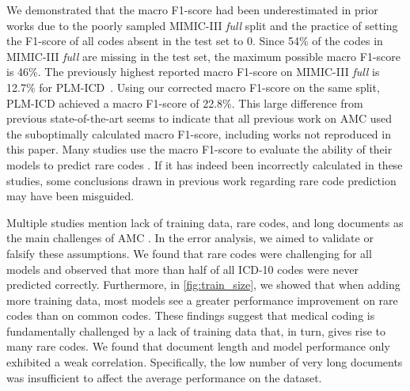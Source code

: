 {We demonstrated that the macro F1-score had been underestimated in prior works due to the poorly sampled MIMIC-III \textit{full} split and the practice of setting the F1-score of all codes absent in the test set to 0. Since 54\% of the codes in MIMIC-III \textit{full} are missing in the test set, the maximum possible macro F1-score is 46\%. The previously highest reported macro F1-score on MIMIC-III \textit{full} is 12.7\% for PLM-ICD~\parencite{kimReadAttendCode2021}. Using our corrected macro F1-score on the same split, PLM-ICD achieved a macro F1-score of 22.8\%. This large difference from previous state-of-the-art seems to indicate that all previous work on AMC used the suboptimally calculated macro F1-score, including works not reproduced in this paper. Many studies use the macro F1-score to evaluate the ability of their models to predict rare codes \parencite{kimReadAttendCode2021, yuanCodeSynonymsMatter2022}. If it has indeed been incorrectly calculated in these studies, some conclusions drawn in previous work regarding rare code prediction may have been misguided.

Multiple studies mention lack of training data, rare codes, and long documents as the main challenges of AMC \parencite{dongExplainableAutomatedCoding2021,feuchtDescriptionbasedLabelAttention2021,huangPLMICDAutomaticICD2022,jiDoesMagicBERT2021,liICDCodingClinical2020,liuEffectiveConvolutionalAttention2021,moonsComparisonDeepLearning2020,pascualBERTbasedAutomaticICD2021,tengReviewDeepNeural2022,tengExplainablePredictionMedical2020, vuLabelAttentionModel2020, venkateshAutomatingOverburdenedClinical2023}. In the error analysis, we aimed to validate or falsify these assumptions. We found that rare codes were challenging for all models and observed that more than half of all ICD-10 codes were never predicted correctly. Furthermore, in \cref{fig:train_size}, we showed that when adding more training data, most models see a greater performance improvement on rare codes than on common codes. 
These findings suggest that medical coding is fundamentally challenged by a lack of training data that, in turn, gives rise to many rare codes.
We found that document length and model performance only exhibited a weak correlation. Specifically, the low number of very long documents was insufficient to affect the average performance on the dataset. 

}
